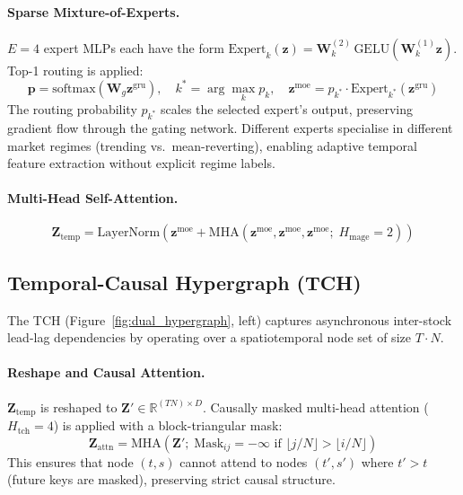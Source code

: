 \documentclass[a4paper,11pt]{report}
\begin{document}
\paragraph{Sparse Mixture-of-Experts.}
$E = 4$ expert MLPs each have the form $\text{Expert}_k(\mathbf{z}) = \mathbf{W}^{(2)}_k\,\text{GELU}(\mathbf{W}^{(1)}_k\mathbf{z})$. Top-1 routing is applied:
\begin{equation}
\mathbf{p} = \text{softmax}(\mathbf{W}_g\mathbf{z}^{\text{gru}}), \quad k^* = \arg\max_k p_k, \quad
\mathbf{z}^{\text{moe}} = p_{k^*}\cdot\text{Expert}_{k^*}(\mathbf{z}^{\text{gru}})
\end{equation}
The routing probability $p_{k^*}$ scales the selected expert's output, preserving gradient flow through the gating network. Different experts specialise in different market regimes (trending vs.\ mean-reverting), enabling adaptive temporal feature extraction without explicit regime labels.

\paragraph{Multi-Head Self-Attention.}
\begin{equation}
\mathbf{Z}_{\text{temp}} = \text{LayerNorm}\!\left(\mathbf{z}^{\text{moe}} + \text{MHA}(\mathbf{z}^{\text{moe}},\mathbf{z}^{\text{moe}},\mathbf{z}^{\text{moe}};\;H_{\text{mage}}=2)\right)
\end{equation}

\subsection{Temporal-Causal Hypergraph (TCH)}

The TCH (Figure~\ref{fig:dual_hypergraph}, left) captures asynchronous inter-stock lead-lag dependencies by operating over a spatiotemporal node set of size $T \cdot N$.

\paragraph{Reshape and Causal Attention.}
$\mathbf{Z}_{\text{temp}}$ is reshaped to $\mathbf{Z}' \in \mathbb{R}^{(TN)\times D}$. Causally masked multi-head attention ($H_{\text{tch}}=4$) is applied with a block-triangular mask:
\begin{equation}
\mathbf{Z}_{\text{attn}} = \text{MHA}(\mathbf{Z}';\;\text{Mask}_{ij}=-\infty \text{ if } \lfloor j/N \rfloor > \lfloor i/N \rfloor)
\end{equation}
This ensures that node $(t,s)$ cannot attend to nodes $(t',s')$ where $t' > t$ (future keys are masked), preserving strict causal structure.
\end{document}
